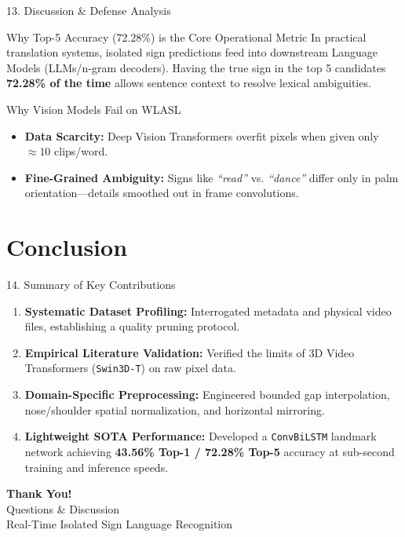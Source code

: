 \documentclass[aspectratio=169, 10pt]{beamer}
\begin{document}
\begin{frame}{13. Discussion \& Defense Analysis}
  \begin{block}{Why Top-5 Accuracy (72.28\%) is the Core Operational Metric}
    In practical translation systems, isolated sign predictions feed into downstream Language Models (LLMs/n-gram decoders). Having the true sign in the top 5 candidates \textbf{72.28\% of the time} allows sentence context to resolve lexical ambiguities.
  \end{block}

  \begin{block}{Why Vision Models Fail on WLASL}
    \begin{itemize}
      \item \textbf{Data Scarcity:} Deep Vision Transformers overfit pixels when given only $\approx 10$ clips/word.
      \item \textbf{Fine-Grained Ambiguity:} Signs like \textit{``read''} vs. \textit{``dance''} differ only in palm orientation—details smoothed out in frame convolutions.
    \end{itemize}
  \end{block}
\end{frame}

\section{Conclusion}

\begin{frame}{14. Summary of Key Contributions}
  \begin{enumerate}
    \item \textbf{Systematic Dataset Profiling:} Interrogated metadata and physical video files, establishing a quality pruning protocol.
    \item \textbf{Empirical Literature Validation:} Verified the limits of 3D Video Transformers (\texttt{Swin3D-T}) on raw pixel data.
    \item \textbf{Domain-Specific Preprocessing:} Engineered bounded gap interpolation, nose/shoulder spatial normalization, and horizontal mirroring.
    \item \textbf{Lightweight SOTA Performance:} Developed a \texttt{ConvBiLSTM} landmark network achieving \textbf{43.56\% Top-1 / 72.28\% Top-5} accuracy at sub-second training and inference speeds.
  \end{enumerate}
\end{frame}

\begin{frame}
  \centering
  \Huge \textbf{Thank You!} \\
  \vspace{0.5cm}
  \Large Questions \& Discussion \\
  \vspace{1cm}
  \normalsize Real-Time Isolated Sign Language Recognition
\end{frame}
\end{document}
